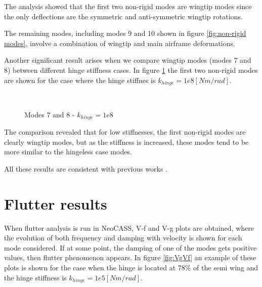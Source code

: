 \documentclass[conference]{IEEEtran}
\begin{document}
The analysis showed that the first two non-rigid modes are wingtip modes since the only deflections are the symmetric and anti-symmetric wingtip rotations.

The remaining modes, including modes 9 and 10 shown in figure \ref{fig:non-rigid modes}, involve a combination of wingtip and main airframe deformations.

Another significant result arises when we compare wingtip modes (modes 7 and 8) between different hinge stiffness cases. In figure \ref{fig:modes7-8-1e8} the first two non-rigid modes are shown for the case where the hinge stiffnes is $k_{hinge} = 1e8 [Nm/rad]$.

\begin{figure}
\centering
{}\:\:\: 
\\
\caption{Modes 7 and 8 - $k_{hinge} = 1e8$}
\label{fig:modes7-8-1e8}
\end{figure}

The comparison revealed that for low stiffnesses, the first non-rigid modes are clearly wingtip modes, but as the stiffness is increased, these modes tend to be more similar to the hingeless case modes.

All these results are consistent with previous works \cite{Castrichini2016, Wilson2014, Castrichini2020}.


\section{Flutter results}  
When flutter analysis is run in NeoCASS, V-f and V-g plots are obtained, where the evolution of both frequency and damping with velocity is shown for each mode considered. If at some point, the damping of one of the modes gets positive values, then flutter phenomenon appears. In figure \ref{fig:VgVf} an example of these plots is shown for the case when the hinge is located at 78\% of the semi wing and the hinge stiffness is  $k_{hinge} = 1e5 [Nm/rad]$.
\end{document}
